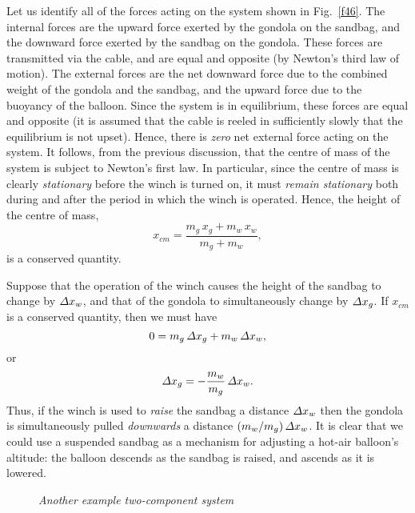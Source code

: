 Let us identify all of the forces acting on the system shown in Fig.~\ref{f46}. The internal forces are
the upward force exerted by the gondola on the sandbag, and the downward force exerted by the
sandbag on the gondola. These forces are transmitted via the cable, and
are equal and opposite (by Newton's third law of motion). The external forces are the
net downward force due to the combined weight of the gondola and the sandbag, and the
upward force due to the buoyancy of the balloon. Since the system is
in equilibrium, these forces are equal and opposite (it is assumed that the cable is reeled in
sufficiently slowly that the equilibrium is not upset). Hence, there is {\em zero}
 net external force acting on the system. It follows, from the previous discussion, that the
centre of mass of the system is subject to Newton's first law. In particular, since the
centre of mass is clearly {\em stationary} before the winch is turned on, it must {\em remain
stationary} both during and after the period in which the
 winch is operated. Hence, the height of the centre of mass,
\begin{equation}
x_{cm} = \frac{m_g\,x_g + m_w\,x_w}{m_g+m_w},
\end{equation}
is a conserved quantity. 

Suppose that the operation of the winch causes the height of the sandbag to change
by ${\mit\Delta}x_w$, and that of the gondola to simultaneously change by ${\mit\Delta}x_g$. If
$x_{cm}$ is a conserved quantity, then we must have
\begin{equation}
0 = m_g\,{\mit\Delta}x_g+m_w\,{\mit\Delta}x_w,
\end{equation}
or
\begin{equation}
{\mit\Delta}x_g =- \frac{m_w}{m_g} \,{\mit\Delta}x_w.
\end{equation}
Thus, if the winch is used to {\em raise} the sandbag a distance ${\mit\Delta}x_w$ then the gondola
is simultaneously pulled {\em downwards}  a distance  $(m_w/m_g) \,{\mit\Delta}x_w$.
It is clear that we could use a suspended sandbag as a mechanism for
adjusting a hot-air  balloon's altitude: the balloon descends as the sandbag is raised, and ascends
as it is lowered. 

\begin{figure}
\epsfysize=1.5in
\centerline{}
\caption{\em Another example two-component system}\label{f47}  
\end{figure}

